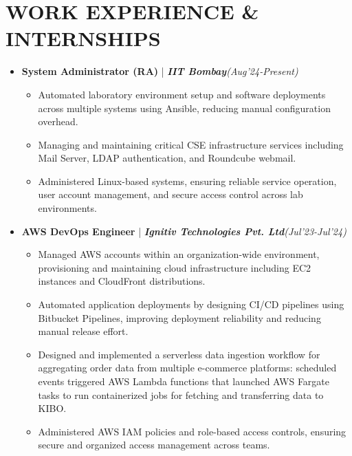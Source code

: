 \documentclass[a4paper,10pt]{article}
\begin{document}
\section*{WORK EXPERIENCE \& INTERNSHIPS}
\begin{itemize}
    \item \textbf{System Administrator (RA) } | \textbf{\emph{IIT Bombay}}\hfill \emph{(Aug'24-Present)}
    \begin{itemize}
        \item Automated laboratory environment setup and software deployments across multiple systems using Ansible, reducing manual configuration overhead.
        \item Managing and maintaining critical CSE infrastructure services including Mail Server, LDAP authentication, and Roundcube webmail.
        \item Administered Linux-based systems, ensuring reliable service operation, user account management, and secure access control across lab environments.
    \end{itemize}

    \item \textbf{AWS DevOps Engineer} | \textbf{\emph{Ignitiv Technologies Pvt. Ltd}}\hfill \emph{(Jul'23-Jul'24)}
    \begin{itemize}
        \item Managed AWS accounts within an organization-wide environment, provisioning and maintaining cloud infrastructure including EC2 instances and CloudFront distributions.
        \item Automated application deployments by designing CI/CD pipelines using Bitbucket Pipelines, improving deployment reliability and reducing manual release effort.
        \item Designed and implemented a serverless data ingestion workflow for aggregating order data from multiple e-commerce platforms: scheduled events triggered AWS Lambda functions that launched AWS Fargate tasks to run containerized jobs for fetching and transferring data to KIBO.
        \item Administered AWS IAM policies and role-based access controls, ensuring secure and organized access management across teams.
    \end{itemize}


\end{itemize}
\end{document}
